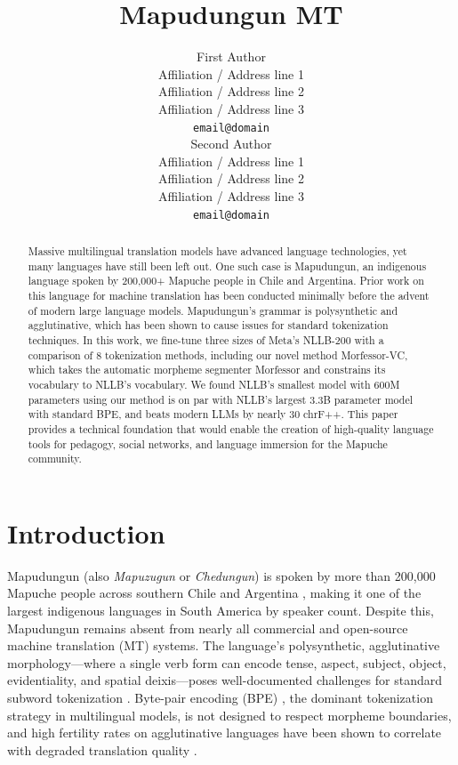 \documentclass[11pt]{article}
\title{Mapudungun MT}
\author{First Author \\
  Affiliation / Address line 1 \\
  Affiliation / Address line 2 \\
  Affiliation / Address line 3 \\
  \texttt{email@domain} \\\And
  Second Author \\
  Affiliation / Address line 1 \\
  Affiliation / Address line 2 \\
  Affiliation / Address line 3 \\
  \texttt{email@domain} \\}
\begin{document}
\maketitle
\begin{abstract}
Massive multilingual translation models have advanced language technologies, yet many languages have still been left out. One such case is Mapudungun, an indigenous language spoken by 200,000+ Mapuche people in Chile and Argentina. Prior work on this language for machine translation has been conducted minimally before the advent of modern large language models. Mapudungun's grammar is polysynthetic and agglutinative, which has been shown to cause issues for standard tokenization techniques. In this work, we fine-tune three sizes of Meta's NLLB-200 with a comparison of 8 tokenization methods, including our novel method Morfessor-VC, which takes  the automatic morpheme segmenter Morfessor and constrains its vocabulary to NLLB's vocabulary. We found NLLB's smallest model with 600M parameters using our method is on par with NLLB's largest 3.3B parameter model with standard BPE, and beats modern LLMs by nearly 30 chrF++. This paper provides a technical foundation that would enable the creation of high-quality language tools for pedagogy, social networks, and language immersion for the Mapuche community.
\end{abstract}

\section{Introduction}

Mapudungun (also \textit{Mapuzugun} or \textit{Chedungun}) is spoken by more than 200,000 Mapuche people across southern Chile and Argentina \cite{duan2020avenue}, making it one of the largest indigenous languages in South America by speaker count. Despite this, Mapudungun remains absent from nearly all commercial and open-source machine translation (MT) systems. The language's polysynthetic, agglutinative morphology—where a single verb form can encode tense, aspect, subject, object, evidentiality, and spatial deixis—poses well-documented challenges for standard subword tokenization \cite{rust2021good,mielke2021between,petrov2023language}. Byte-pair encoding (BPE) \cite{sennrich2016bpe}, the dominant tokenization strategy in multilingual models, is not designed to respect morpheme boundaries, and high fertility rates on agglutinative languages have been shown to correlate with degraded translation quality \cite{ahia2023all,banerjee2018morpheme}.
\end{document}
